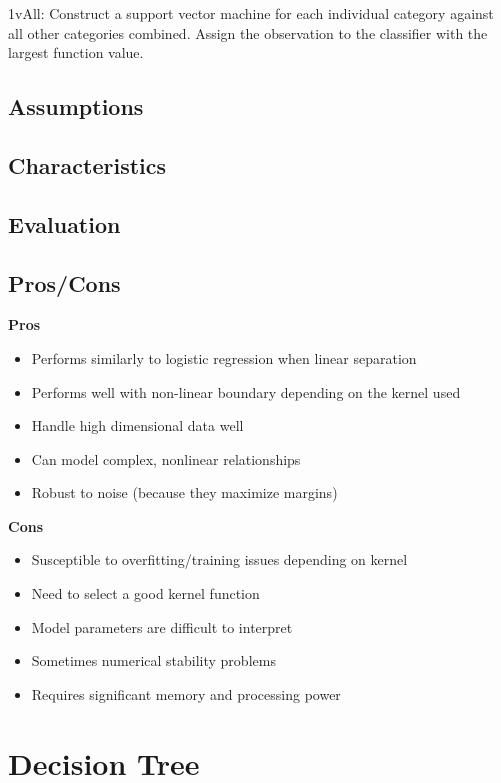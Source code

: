 \documentclass[]{book}
\theoremstyle{definition}
\theoremstyle{definition}
\theoremstyle{definition}
\theoremstyle{remark}
\begin{document}
1vAll: Construct a support vector machine for each individual category
against all other categories combined. Assign the observation to the
classifier with the largest function value.

\subsection{Assumptions}\label{assumptions-9}

\subsection{Characteristics}\label{characteristics-4}

\subsection{Evaluation}\label{evaluation-8}

\subsection{Pros/Cons}\label{proscons-9}

\textbf{Pros}

\begin{itemize}
\item
  Performs similarly to logistic regression when linear separation
\item
  Performs well with non-linear boundary depending on the kernel used
\item
  Handle high dimensional data well
\item
  Can model complex, nonlinear relationships
\item
  Robust to noise (because they maximize margins)
\end{itemize}

\textbf{Cons}

\begin{itemize}
\item
  Susceptible to overfitting/training issues depending on kernel
\item
  Need to select a good kernel function
\item
  Model parameters are difficult to interpret
\item
  Sometimes numerical stability problems
\item
  Requires significant memory and processing power
\end{itemize}

\section{Decision Tree}\label{decision-tree}
\end{document}
